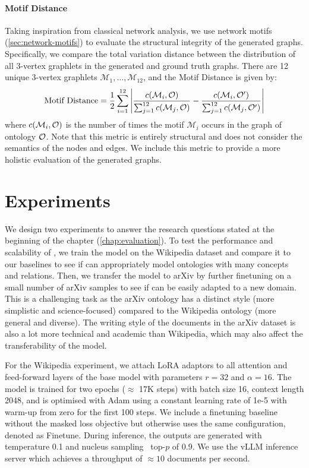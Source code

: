 \paragraph{Motif Distance}
Taking inspiration from classical network analysis, we use network motifs (\cref{sec:network-motifs}) to evaluate the structural integrity of the generated graphs. Specifically, we compare the total variation distance \cite{levin2017markov} between the distribution of all 3-vertex graphlets in the generated and ground truth graphs. There are 12 unique 3-vertex graphlets $\mathcal{M}_1, \ldots, \mathcal{M}_{12}$, and the Motif Distance is given by:
\[
    \text{Motif Distance} = \frac{1}{2} \sum_{i=1}^{12} \left|
    \frac{c(\mathcal{M}_i, \mathcal{O})}{\sum_{j=1}^{12} c(\mathcal{M}_j, \mathcal{O})} -
    \frac{c(\mathcal{M}_i, \mathcal{O}')}{\sum_{j=1}^{12} c(\mathcal{M}_j, \mathcal{O}')}
    \right|
\]
where $c(\mathcal{M}_i, \mathcal{O})$ is the number of times the motif $\mathcal{M}_i$ occurs in the graph of ontology $\mathcal{O}$. Note that this metric is entirely structural and does not consider the semantics of the nodes and edges. We include this metric to provide a more holistic evaluation of the generated graphs.


\section{Experiments}  \label{sec:experiments} \label{sec:implementation}

We design two experiments to answer the research questions stated at the beginning of the chapter (\cref{chap:evaluation}). To test the performance and scalability of \name, we train the model on the Wikipedia dataset and compare it to our baselines to see if \name can appropriately model ontologies with many concepts and relations. Then, we transfer the model to arXiv by further finetuning on a small number of arXiv samples to see if \name can be easily adapted to a new domain. This is a challenging task as the arXiv ontology has a distinct style (more simplistic and science-focused) compared to the Wikipedia ontology (more general and diverse). The writing style of the documents in the arXiv dataset is also a lot more technical and academic than Wikipedia, which may also affect the transferability of the model.

For the Wikipedia experiment, we attach LoRA adaptors to all attention and feed-forward layers of the base model with parameters $r=32$ and $\alpha=16$. The model is trained for two epochs ($\approx$ 17K steps) with batch size 16, context length 2048, and is optimised with Adam using a constant learning rate of 1e-5 with warm-up from zero for the first 100 steps. We include a finetuning baseline without the masked loss objective but otherwise uses the same configuration, denoted as Finetune. During inference, the outputs are generated with temperature 0.1 and nucleus sampling~\cite{holtzman2019curious} top-$p$ of 0.9. We use the vLLM \cite{kwon2023efficient} inference server which achieves a throughput of $\approx 10$ documents per second.

